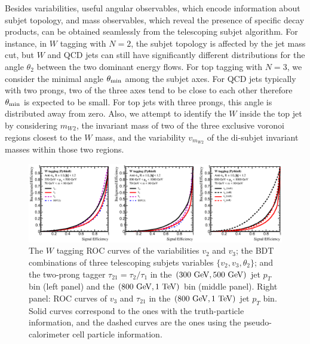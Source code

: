 \documentclass[aps,prl,floatfix,preprintnumbers,twocolumn,groupedaddress,nofootinbib]{revtex4-1}
\begin{document}
Besides variabilities, useful angular observables, which encode information about subjet topology, and mass observables, which reveal the presence of specific decay products, can be obtained seamlessly from the telescoping subjet algorithm. For instance, in $W$ tagging with $N=2$, the subjet topology is affected by the jet mass cut, but $W$ and QCD jets can still have significantly different distributions for the angle $\theta_2$ between the two dominant energy flows. For top tagging with $N=3$, we consider the minimal angle $\theta_{\rm min}$ among the subjet axes. For QCD jets typically with two prongs, two of the three axes tend to be close to each other therefore $\theta_{\rm min}$ is expected to be small. For top jets with three prongs, this angle is distributed away from zero. Also, we attempt to identify the $W$ inside the top jet \cite{Thaler:2008ju,Kaplan:2008ie} by considering \textbf{$m_{W2}$}, the invariant mass of two of the three exclusive voronoi regions closest to the $W$ mass, and the variability $v_{m_{W2}}$ of the di-subjet invariant masses within those two regions.

\begin{figure}
    \includegraphics[width=2\columnwidth]{plots/W_ROCs_6.eps}
    \caption{The $W$ tagging ROC curves of the variabilities $v_2$ and $v_3$;
    the BDT combinations of three telescoping subjets variables $\{v_2, v_3, \theta_2\}$; and the two-prong tagger $\tau_{21}=\tau_{2}/\tau_{1}$ in the $(300~{\rm GeV}, 500~{\rm GeV})$ jet $p_T$ bin (left panel) and the $(800~{\rm GeV}, 1~{\rm TeV})$ bin (middle panel). Right panel: ROC curves of $v_3$ and $\tau_{21}$ in the $(800~{\rm GeV}, 1~{\rm TeV})$ jet $p_T$ bin. Solid curves correspond to the ones with the truth-particle information, and the dashed curves are the ones using the pseudo-calorimeter cell particle information.}
\label{ROC_W}
\end{figure}
\end{document}
